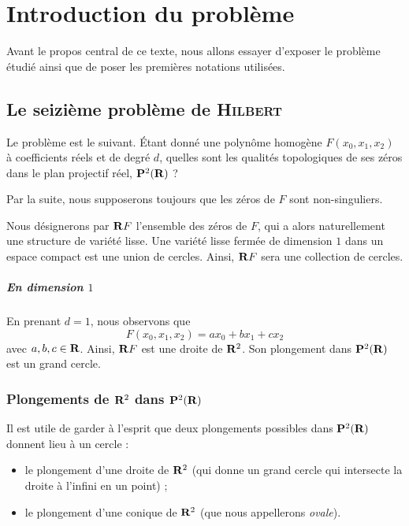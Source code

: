 \documentclass{livre}
\date{\today}
\begin{document}
\tableofcontents

\newpage
\chapter{Introduction du problème}

Avant le propos central de ce texte, nous allons essayer d'exposer le problème étudié ainsi que de poser les premières notations utilisées.

\section{Le seizième problème de \textsc{Hilbert}}

Le problème est le suivant. \'Etant donné une polynôme homogène $F(x_0,x_1,x_2)$ à coefficients réels et de degré $d$, quelles sont les qualités topologiques de ses zéros dans le plan projectif réel, $\mathbf{P}^{2}(\mathbf{R})$ ? 

Par la suite, nous supposerons toujours que les zéros de $F$ sont non-singuliers.

Nous désignerons par $\mathbf{R} F$ l'ensemble des zéros de $F$, qui a alors  naturellement une structure de variété lisse. Une variété lisse fermée de dimension $1$ dans un espace compact est une union de cercles. Ainsi, $\mathbf{R} F$ sera une collection de cercles.


\paragraph{En dimension $1$}En prenant $d=1$, nous observons que \[ F(x_0,x_1,x_2) = ax_0 + bx_1+cx_2 \]avec $a,b,c\in \mathbf{R}$. Ainsi, $\mathbf{R} F$ est une droite de $\mathbf{R}^{2}$. Son plongement dans $\mathbf{P}^{2}(\mathbf{R})$ est un grand cercle.

\subsection*{Plongements de $\mathbf{R}^{2}$ dans $\mathbf{P}^{2}(\mathbf{R})$}

Il est utile de garder à l'esprit que deux plongements possibles dans $\mathbf{P}^{2}(\mathbf{R})$ donnent lieu à un cercle :

\begin{itemize}
\item le plongement d'une droite de $\mathbf{R}^{2}$ (qui donne un grand cercle qui intersecte la droite à l'infini en un point) ;
\item le plongement d'une conique de $\mathbf{R}^{2}$ (que nous appellerons \textit{ovale}).
\end{itemize}
\end{document}
